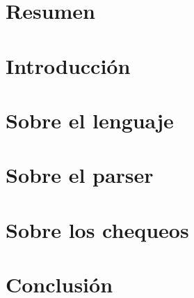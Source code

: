 \documentclass[twoside]{report}
\begin{document}


\chapter*{Resumen}


\tableofcontents

\chapter{Introducción}


\chapter{Sobre el lenguaje}

\chapter{Sobre el parser}



\chapter{Sobre los chequeos}



\chapter{Conclusión}


\printbibliography
\end{document}
